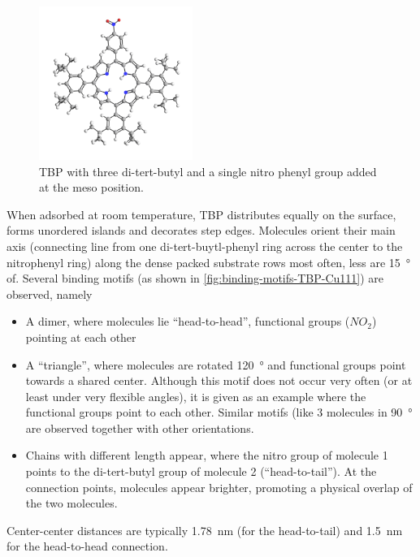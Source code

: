 \label{sec:single-TBP-Cu111}
\begin{figure}\centering
	\includegraphics[angle=90, width=5cm]{./images/molecules/max-zoom/TBP-single-600}
	\caption{TBP with three di-tert-butyl and a single nitro phenyl group added at the meso position.}
	\label{fig:}
\end{figure}
When adsorbed at room temperature, TBP distributes equally on the surface, forms unordered islands and decorates step edges. Molecules orient their main axis (connecting line from one di-tert-buytl-phenyl ring across the center to the nitrophenyl ring) along the dense packed substrate rows most often, less are \SI{15}{\degree} of. Several binding motifs (as shown in \autoref{fig:binding-motifs-TBP-Cu111}) are observed, namely
\begin{itemize}
 \item A dimer, where molecules lie ``head-to-head'', functional groups ($NO_2$) pointing at each other
 \item A ``triangle'', where molecules are rotated \SI{120}{\degree} and functional groups point towards a shared center. Although this motif does not occur very often (or at least under very flexible angles), it is given as an example where the functional groups point to each other. Similar motifs (like 3 molecules in \SI{90}{\degree} are observed together with other orientations. 
 \item Chains with different length appear, where the nitro group of molecule 1 points to the di-tert-butyl group of molecule 2 (``head-to-tail''). At the connection points, molecules appear brighter, promoting a physical overlap of the two molecules.
\end{itemize}

Center-center distances are typically \SI{1.78}{\nano \meter} (for the head-to-tail) and \SI{1.5}{\nano \meter} for the head-to-head connection. 

